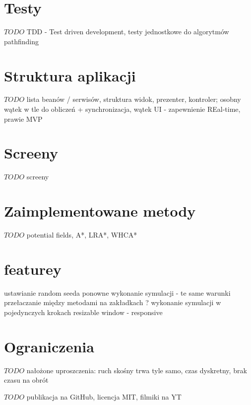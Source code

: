 \section{Testy}
$TODO$ TDD - Test driven development, testy jednostkowe do algorytmów pathfinding

\section{Struktura aplikacji}
$TODO$ lista beanów / serwisów, struktura widok, prezenter, kontroler; osobny wątek w tle do obliczeń + synchronizacja, wątek UI - zapewnienie REal-time, prawie MVP


\section{Screeny}
$TODO$ screeny

\section{Zaimplementowane metody}
$TODO$ potential fields, A*, LRA*, WHCA*

\section{featurey}
ustawianie random seeda
ponowne wykonanie symulacji - te same warunki
przełaczanie między metodami na zakładkach ?
wykonanie symulacji w pojedynczych krokach
resizable window - responsive

\section{Ograniczenia}
$TODO$ nałożone uproszczenia: ruch skośny trwa tyle samo, czas dyskretny, brak czasu na obrót

$TODO$ publikacja na GitHub, licencja MIT, filmiki na YT